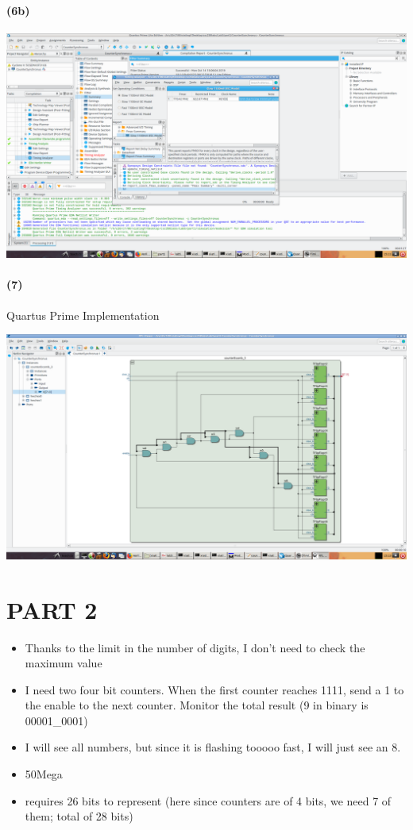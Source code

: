 \documentclass{article}
\begin{document}
\paragraph{(6b)} 
\begin{center}
    \includegraphics[scale=0.25]{q1_6b.png}
\end{center}

\paragraph{(7)} Quartus Prime Implementation
\begin{center}
    \includegraphics[scale=0.25]{q1_7.png}
\end{center}

\section*{PART 2}
\begin{itemize}
    \item Thanks to the limit in the number of digits, I don't need to check the maximum value
    \item I need two four bit counters. When the first counter reaches 1111, send a 1 to the enable to the next counter. Monitor the total result (9 in binary is 00001\_0001)
    \item I will see all numbers, but since it is flashing tooooo fast, I will just see an 8.
    \item 50Mega 
    \item requires 26 bits to represent (here since counters are of 4 bits, we need 7 of them; total of 28 bits)
\end{itemize}
\end{document}
